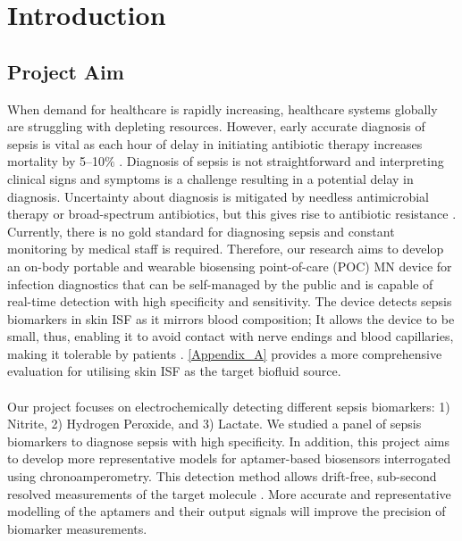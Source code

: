 \section{Introduction}
\subsection{Project Aim}
When demand for healthcare is rapidly increasing, healthcare systems globally are struggling with depleting resources. However, early accurate diagnosis of sepsis is vital as each hour of delay in initiating antibiotic therapy increases mortality by 5–10$\%$ \cite{heikenfeld2018lab,bauer2010molecular}. Diagnosis of sepsis is not straightforward and interpreting clinical signs and symptoms is a challenge resulting in a potential delay in diagnosis. Uncertainty about diagnosis is mitigated by needless antimicrobial therapy or  broad-spectrum antibiotics, but this gives rise to antibiotic resistance \cite{hung2020current}. Currently, there is no gold standard for diagnosing sepsis and constant monitoring by medical staff is required. Therefore, our research aims to develop an on-body portable and wearable biosensing point-of-care (POC) MN device for infection diagnostics that can be self-managed by the public and is capable of real-time detection with high specificity and sensitivity. The device detects sepsis biomarkers in skin ISF as it mirrors blood composition; It allows the device to be small, thus, enabling it to avoid contact with nerve endings and blood capillaries, making it tolerable by patients \cite{liu2020microneedles}. \autoref{Appendix_A} provides a more comprehensive evaluation for utilising skin ISF as the target biofluid source.\\\\
Our project focuses on electrochemically detecting different sepsis biomarkers: 1) Nitrite, 2) Hydrogen Peroxide, and 3) Lactate. We studied a panel of sepsis biomarkers to diagnose sepsis with high specificity. In addition, this project aims to develop more representative models for aptamer-based biosensors interrogated using chronoamperometry. This detection method allows drift-free, sub-second resolved measurements of the target molecule \cite{arroyo2018subsecond}. More accurate and representative modelling of the aptamers and their output signals will improve the precision of biomarker measurements.\\\\